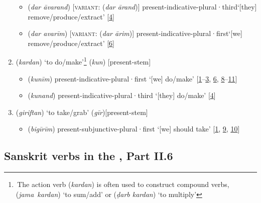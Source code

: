 \begin{enumerate}
\begin{itemize}
        \item {} (\textit{dar āvarand}) [\textsc{variant}:  (\textit{dar ārand})] \acrshort{present}-\acrshort{indicative}-\acrshort{plural}·\acrshort{third}\newline `[they] remove/produce/extract' [\hyperlink{Ppass4}{4}]
        \item {} (\textit{dar avarīm}) [\textsc{variant}:  (\textit{dar ārim})]
        \acrshort{present}-\acrshort{indicative}-\acrshort{plural}·\acrshort{first}\newline `[we] remove/produce/extract' [\hyperlink{Ppass6}{6}]
    \end{itemize}
    \item {} (\textit{kardan}) `to do/make'\footnote{\,The action verb  (\textit{kardan}) is often used to construct compound verbs, \eg {} (\textit{jama}\Ayn\ \textit{kardan}) `to sum/add' or  (\textit{ḍarb kardan}) `to multiply'\label{compound_action_verb_persian}} \hfill  {} (\textit{kun}) [\acrshort{present}-\acrshort{stem}]
    \begin{itemize}
        \item {} (\textit{kunīm}) \acrshort{present}-\acrshort{indicative}-\acrshort{plural}·\acrshort{first} `[we] do/make' [\hyperlink{Ppass1}{1}--\hyperlink{Ppass3}{3}, \hyperlink{Ppass6}{6}, \hyperlink{Ppass8}{8}--\hyperlink{Ppass11}{11}]
        \item {} (\textit{kunand}) \acrshort{present}-\acrshort{indicative}-\acrshort{plural}·\acrshort{third} `[they] do/make' [\hyperlink{Ppass4}{4}]
    \end{itemize}
    \item {} (\textit{giriftan}) `to take/grab' \hfill  {} (\textit{gīr})[\acrshort{present}-\acrshort{stem}]
    \begin{itemize}
        \item {} (\textit{bigīrīm}) \acrshort{present}-\acrshort{subjunctive}-\acrshort{plural}·\acrshort{first} `[we] should take' [\hyperlink{Ppass1}{1}, \hyperlink{Ppass9}{9}, \hyperlink{Ppass10}{10}]
    \end{itemize}
\end{enumerate}
\clearpage

\subsection*{Sanskrit verbs in the \Siddhantasindhu, Part II.6} \label{sanskrit_verbs}


